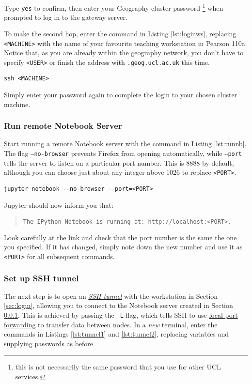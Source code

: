 \documentclass[a4paper]{article}
\begin{document}
Type \texttt{yes} to confirm, then enter your Geography cluster password \footnote{this is not necessarily the same password that you use for other UCL services.} when prompted to log in to the gateway server.

To make the second hop, enter the command in Listing \ref{lst:loginws}, replacing \texttt{\textless{}MACHINE\textgreater{}} with the name of your favourite teaching workstation in Pearson 110a. Notice that, as you are already within the geography network, you don't have to specify \texttt{\textless{}USER\textgreater{}} or finish the address with \texttt{.geog.ucl.ac.uk} this time.

\begin{lstlisting}[caption={Login to workstation}, label={lst:loginws}]
ssh <MACHINE>
\end{lstlisting}

Simply enter your password again to complete the login to your chosen cluster machine.

\subsubsection{Run remote Notebook Server}
\label{sec:runnb}

Start running a remote Notebook server with the command in Listing \ref{lst:runnb}.
The flag \texttt{--no-browser} prevents Firefox from opening automatically, while \texttt{--port} tells the server to listen on a particular port number.
This is 8888 by default, although you can choose just about any integer above 1026 to replace \texttt{\textless{}PORT\textgreater{}}.

\begin{lstlisting}[caption={Run Notebook server}, label={lst:runnb}]
jupyter notebook --no-browser --port=<PORT>
\end{lstlisting}

Jupyter should now inform you that:
\begin{quote}
\texttt{The IPython Notebook is running at: http://localhost:\textless{}PORT\textgreater{}.}
\end{quote}
Look carefully at the link and check that the port number is the same the one you specified.
If it has changed, simply note down the new number and use it as \texttt{\textless{}PORT\textgreater{}} for all subsequent commands.

\subsubsection{Set up SSH tunnel}
\label{sec:tunnel}
The next step is to open an \href{http://blog.trackets.com/2014/05/17/ssh-tunnel-local-and-remote-port-forwarding-explained-with-examples.html}{\emph{SSH tunnel}} with the workstation in Section \ref{sec:login}, allowing you to connect to the Notebook server created in Section \ref{sec:runnb}.
This is achieved by passing the \texttt{-L} flag, which tells SSH to use \href{https://help.ubuntu.com/community/SSH/OpenSSH/PortForwarding}{local port forwarding} to transfer data between nodes. 
In a \emph{new} terminal, enter the commands in Listings \ref{lst:tunnel1} and \ref{lst:tunnel2}, replacing variables and supplying passwords as before.
\end{document}
